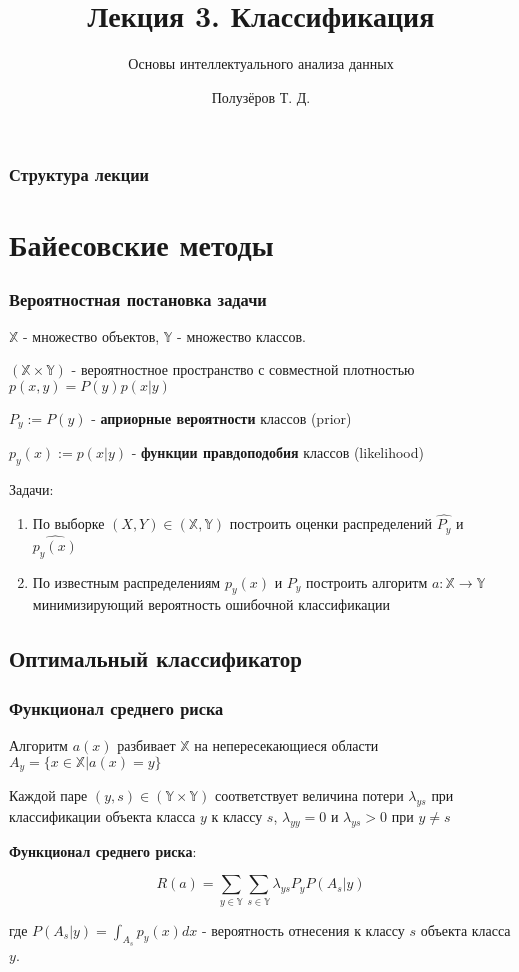 \documentclass{beamer}
\title[Классификация]{Лекция 3. Классификация}
\subtitle{Основы интеллектуального анализа данных}
\author{Полузёров Т. Д.}
\institute{БГУ ФПМИ}
\date{}
\begin{document}
	
	\begin{frame}
		\titlepage
	\end{frame}
	
	\begin{center}
		\frametitle{Структура лекции}
		\tableofcontents	
	\end{center}
	
	\section{Байесовские методы}
	
	\begin{frame}
		\frametitle{Вероятностная постановка задачи}
		 $\mathbb{X}$ - множество объектов, $\mathbb{Y}$ - множество классов.
		 
		$(\mathbb{X} \times \mathbb{Y})$ - вероятностное пространство с совместной плотностью $p(x, y) = P(y) p(x | y)$
		 
		$P_y := P(y)$ - \textbf{априорные вероятности} классов (prior)
		
		$p_y(x) := p(x | y)$ - \textbf{функции правдоподобия} классов (likelihood)
		
		\vspace{15pt}
		
		Задачи:
		
		\begin{enumerate}
			\item По выборке $(X, Y) \in (\mathbb{X}, \mathbb{Y})$ построить оценки распределений $\hat{P_y}$ и $\hat{p_y(x)}$
			\item По известным распределениям $p_y(x)$ и $P_y$ построить алгоритм $a: \mathbb{X} \rightarrow \mathbb{Y}$ минимизирующий вероятность ошибочной классификации
		\end{enumerate}
	\end{frame}
	
	\subsection{Оптимальный классификатор}
	
	\begin{frame}
		\frametitle{Функционал среднего риска}
		Алгоритм $a(x)$ разбивает $\mathbb{X}$ на непересекающиеся области $A_y = \{x \in \mathbb{X} | a(x) = y \}$
		
		\vspace{10pt}
		
		Каждой паре $(y, s) \in (\mathbb{Y} \times \mathbb{Y})$ соответствует величина потери $\lambda_{ys}$ при классификации объекта класса $y$ к классу $s$, $\lambda_{yy} = 0$ и $\lambda_{ys} > 0$ при $y \ne s$
		
		\vspace{10pt}
		
		\textbf{Функционал среднего риска}:
		
		 \[
		 R(a) = \sum_{y \in \mathbb{Y}} \sum_{s \in \mathbb{Y}}
		 \lambda_{ys} P_y P(A_s | y)
		 \]
		 
		 где $P(A_s | y) = \int_{A_s} p_y(x) dx$ - вероятность отнесения к классу $s$ объекта класса $y$.	 
	\end{frame}
	
\end{document}
